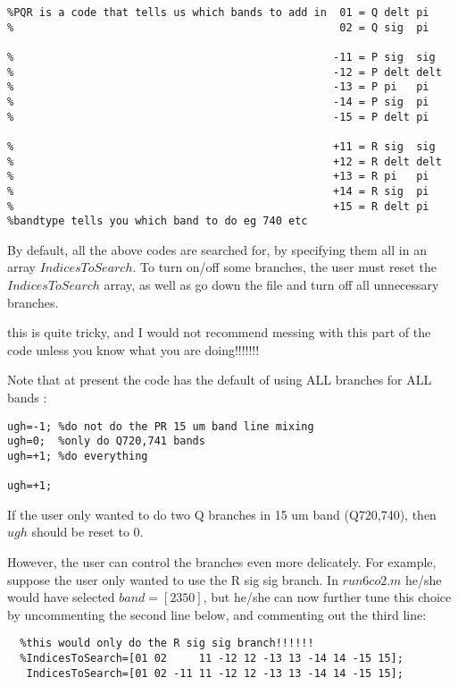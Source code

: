 \documentclass[11pt]{article}
\begin{document}
\begin{verbatim}
%PQR is a code that tells us which bands to add in  01 = Q delt pi 
%                                                   02 = Q sig  pi 
 
%                                                  -11 = P sig  sig 
%                                                  -12 = P delt delt 
%                                                  -13 = P pi   pi 
%                                                  -14 = P sig  pi 
%                                                  -15 = P delt pi 
 
%                                                  +11 = R sig  sig 
%                                                  +12 = R delt delt 
%                                                  +13 = R pi   pi 
%                                                  +14 = R sig  pi 
%                                                  +15 = R delt pi 
%bandtype tells you which band to do eg 740 etc 
\end{verbatim}

By default, all the above codes are searched for, by specifying them all
in an array $IndicesToSearch$. To turn on/off some branches, the user 
must reset the $IndicesToSearch$ array, as well as go down the file and turn 
off all unnecessary branches.
\begin{bf}
this is quite tricky, and I would not recommend messing with this part of 
the code unless you know what you are doing!!!!!!!
\end{bf}

Note that at present the code has the default of using ALL branches for 
ALL bands :
\begin{verbatim}
ugh=-1; %do not do the PR 15 um band line mixing 
ugh=0;  %only do Q720,741 bands 
ugh=+1; %do everything  

ugh=+1;
\end{verbatim}
If the user only wanted to do two Q branches in 15 um band (Q720,740), then 
$ugh$ should be reset to 0. 

However, the user can control the branches even more delicately.
For example, suppose the user only wanted to use the R sig sig branch.
In $run6co2.m$ he/she would have selected $band=[2350]$, but he/she can now
further tune this choice by uncommenting the second line below, and commenting 
out the third line: 

\begin{verbatim}
  %this would only do the R sig sig branch!!!!!! 
  %IndicesToSearch=[01 02     11 -12 12 -13 13 -14 14 -15 15]; 
   IndicesToSearch=[01 02 -11 11 -12 12 -13 13 -14 14 -15 15]; 
\end{verbatim}
\end{document}
